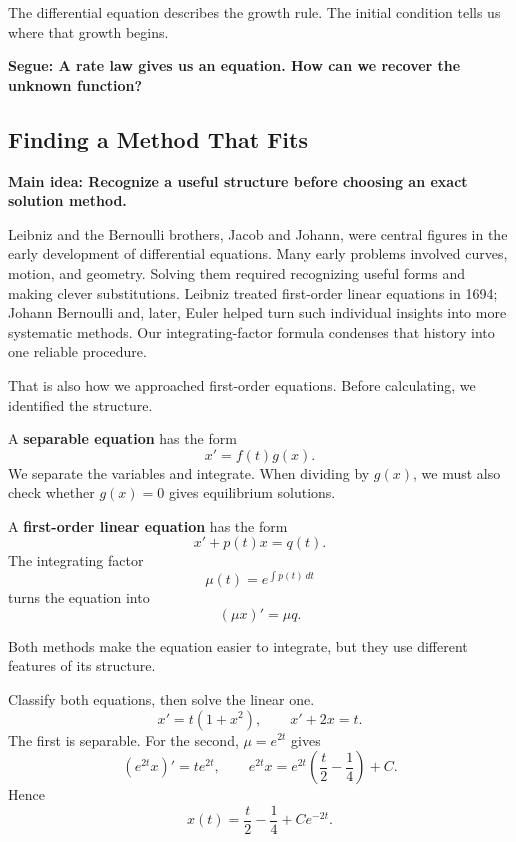 \documentclass[11pt,letterpaper]{article}
\begin{document}
The differential equation describes the growth rule.
The initial condition tells us where that growth begins.

\textbf{Segue: A rate law gives us an equation. How can we recover the unknown function?}

\subsection{Finding a Method That Fits}

\textbf{Main idea: Recognize a useful structure before choosing an exact solution method.}

Leibniz and the Bernoulli brothers, Jacob and Johann,
were central figures in the early development of
differential equations. Many early problems involved
curves, motion, and geometry. Solving them required
recognizing useful forms and making clever substitutions.
Leibniz treated first-order linear equations in 1694;
Johann Bernoulli and, later, Euler helped turn such
individual insights into more systematic methods.
Our integrating-factor formula condenses that history
into one reliable procedure.


That is also how we approached first-order equations.
Before calculating, we identified the structure.

A \textbf{separable equation} has the form
\[
x'=f(t)g(x).
\]
We separate the variables and integrate. When dividing
by $g(x)$, we must also check whether $g(x)=0$ gives
equilibrium solutions.

A \textbf{first-order linear equation} has the form
\[
x'+p(t)x=q(t).
\]
The integrating factor
\[
\mu(t)=e^{\int p(t)\,dt}
\]
turns the equation into
\[
(\mu x)'=\mu q.
\]

Both methods make the equation easier to integrate,
but they use different features of its structure.

\begin{example}{
Classify both equations, then solve the linear one.
\[
x'=t(1+x^2),
\qquad
x'+2x=t.
\]
}
The first is separable. For the second, $\mu=e^{2t}$ gives
\[
(e^{2t}x)'=te^{2t},\qquad
e^{2t}x=e^{2t}\left(\frac t2-\frac14\right)+C.
\]
Hence
\[
\boxed{x(t)=\frac t2-\frac14+Ce^{-2t}.}
\]
\end{example}
\end{document}
